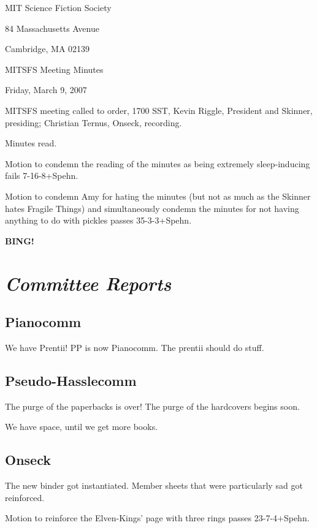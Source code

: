 \documentclass[10pt]{article}
\newcommand{\bing}{{\bf BING!} }
\newcommand{\goto}[1]{\bing \vskip 12pt \section*{{\em{#1}}}}
\begin{document}
\begin{center}

MIT Science Fiction Society

84 Massachusetts Avenue

Cambridge, MA 02139

\vspace{12pt}

MITSFS Meeting Minutes

Friday, March 9, 2007

\end{center}

\vspace{18pt}

\setlength{\parskip}{6pt}

\noindent
MITSFS meeting called to order, 1700 SST,
Kevin Riggle, President and Skinner, presiding; Christian Ternus, Onseck, recording.

Minutes read.

Motion to condemn the reading of the minutes as being extremely sleep-inducing fails 7-16-8+Spehn.

Motion to condemn Amy for hating the minutes (but not as much as the Skinner hates Fragile Things) and simultaneously condemn the minutes for not having anything to do with pickles passes 35-3-3+Spehn.

\goto{Committee Reports}

\subsection*{Pianocomm}

We have Prentii!  PP is now Pianocomm.  The prentii should do stuff.

\subsection*{Pseudo-Hasslecomm}

The purge of the paperbacks is over!  The purge of the hardcovers begins soon.

We have space, until we get more books.

\subsection*{Onseck}

The new binder got instantiated.  Member sheets that were particularly sad got reinforced.

Motion to reinforce the Elven-Kings' page with three rings passes 23-7-4+Spehn.
\end{document}
